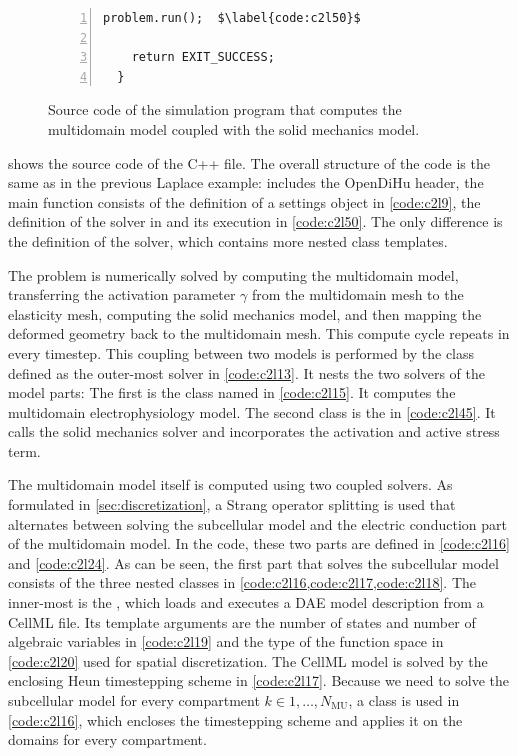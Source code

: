\begin{figure}
\begin{framed}
\begin{lstlisting}[basicstyle=\scriptsize\ttfamily,commentstyle=\color{gray},numbers=left]
    problem.run();  $\label{code:c2l50}$
    
    return EXIT_SUCCESS;
  }
\end{lstlisting}
\end{framed}
\caption{Source code of the simulation program that computes the multidomain model coupled with the solid mechanics model.}%
\label{fig:example_multidomain_source}%
\end{figure}

 shows the source code of the C++ file. The overall structure of the code is the same as in the previous Laplace example:  includes the OpenDiHu header, the main function consists of the definition of a settings object in \cref{code:c2l9}, the definition of the solver in  and its execution in \cref{code:c2l50}. The only difference is the definition of the solver, which contains more nested class templates.

The problem is numerically solved by computing the multidomain model, transferring the activation parameter $\gamma$ from the multidomain mesh to the elasticity mesh, computing the solid mechanics model, and then mapping the deformed geometry back to the multidomain mesh. This compute cycle repeats in every timestep. This coupling between two models is performed by the  class defined as the outer-most solver in \cref{code:c2l13}. It nests the two solvers of the model parts: The first is the class named  in \cref{code:c2l15}. It computes the multidomain electrophysiology model. The second class is the  in \cref{code:c2l45}. It calls the solid mechanics solver and incorporates the activation and active stress term.

The multidomain model itself is computed using two coupled solvers. As formulated in \cref{sec:discretization}, a Strang operator splitting is used that alternates between solving the subcellular model and the electric conduction part of the multidomain model. In the code, these two parts are defined in \cref{code:c2l16} and \cref{code:c2l24}. As can be seen, the first part that solves the subcellular model consists of the three nested classes in \cref{code:c2l16,code:c2l17,code:c2l18}. The inner-most is the , which loads and executes a DAE model description from a CellML file. Its template arguments are the number of states and number of algebraic variables in \cref{code:c2l19} and the type of the function space in \cref{code:c2l20} used for spatial discretization.
The CellML model is solved by the enclosing Heun timestepping scheme in \cref{code:c2l17}. Because we need to solve the subcellular model for every compartment $k \in 1,\dots,N_\text{MU}$, a  class is used in \cref{code:c2l16}, which encloses the timestepping scheme and applies it on the domains for every compartment.

